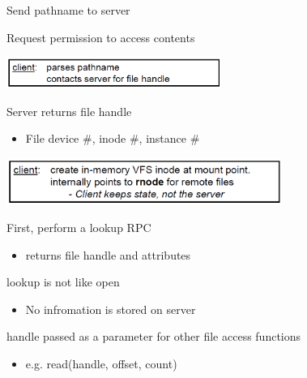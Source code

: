\begin{slide}

	
	Send pathname to server
	\bigskip
	
	Request permission to access contents
	\medskip
	
	\includegraphics[width=70mm]{mounting-protocol-client.png} 
	\medskip
	
	Server returns file handle
	\begin{itemize}
		\item File device \#, inode \#, instance \#
	\end{itemize}
	\medskip
	
	\includegraphics[width=90mm]{mounting-protocol-server.png}
	
\end{slide}

\begin{slide}

	
	First, perform a lookup RPC
	\begin{itemize}
		\item returns file handle and attributes
	\end{itemize}
	\bigskip
	
	lookup is not like open
	\begin{itemize}
		\item No infromation is stored on server
	\end{itemize}
	
	handle passed as a parameter for other file access functions
	\begin{itemize}
		\item e.g. read(handle, offset, count)
	\end{itemize}

\end{slide}


